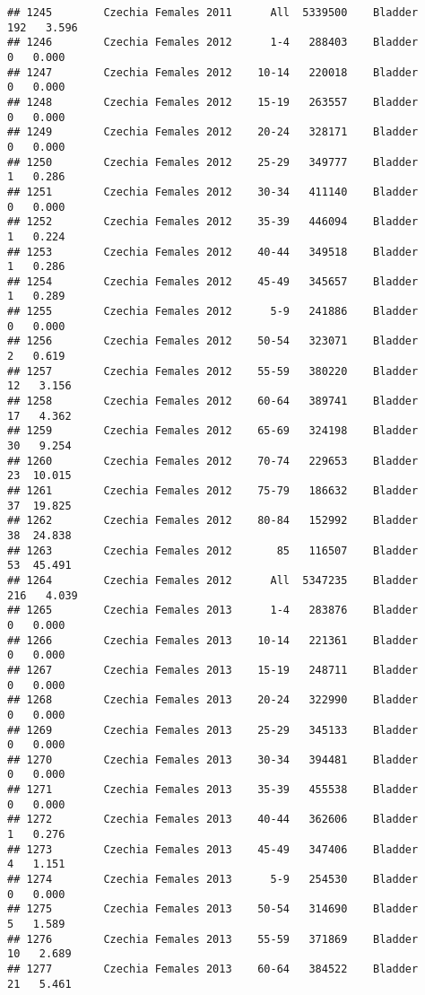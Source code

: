 \documentclass[
]{article}
\begin{document}
\begin{verbatim}
## 1245        Czechia Females 2011      All  5339500    Bladder    192   3.596
## 1246        Czechia Females 2012      1-4   288403    Bladder      0   0.000
## 1247        Czechia Females 2012    10-14   220018    Bladder      0   0.000
## 1248        Czechia Females 2012    15-19   263557    Bladder      0   0.000
## 1249        Czechia Females 2012    20-24   328171    Bladder      0   0.000
## 1250        Czechia Females 2012    25-29   349777    Bladder      1   0.286
## 1251        Czechia Females 2012    30-34   411140    Bladder      0   0.000
## 1252        Czechia Females 2012    35-39   446094    Bladder      1   0.224
## 1253        Czechia Females 2012    40-44   349518    Bladder      1   0.286
## 1254        Czechia Females 2012    45-49   345657    Bladder      1   0.289
## 1255        Czechia Females 2012      5-9   241886    Bladder      0   0.000
## 1256        Czechia Females 2012    50-54   323071    Bladder      2   0.619
## 1257        Czechia Females 2012    55-59   380220    Bladder     12   3.156
## 1258        Czechia Females 2012    60-64   389741    Bladder     17   4.362
## 1259        Czechia Females 2012    65-69   324198    Bladder     30   9.254
## 1260        Czechia Females 2012    70-74   229653    Bladder     23  10.015
## 1261        Czechia Females 2012    75-79   186632    Bladder     37  19.825
## 1262        Czechia Females 2012    80-84   152992    Bladder     38  24.838
## 1263        Czechia Females 2012       85   116507    Bladder     53  45.491
## 1264        Czechia Females 2012      All  5347235    Bladder    216   4.039
## 1265        Czechia Females 2013      1-4   283876    Bladder      0   0.000
## 1266        Czechia Females 2013    10-14   221361    Bladder      0   0.000
## 1267        Czechia Females 2013    15-19   248711    Bladder      0   0.000
## 1268        Czechia Females 2013    20-24   322990    Bladder      0   0.000
## 1269        Czechia Females 2013    25-29   345133    Bladder      0   0.000
## 1270        Czechia Females 2013    30-34   394481    Bladder      0   0.000
## 1271        Czechia Females 2013    35-39   455538    Bladder      0   0.000
## 1272        Czechia Females 2013    40-44   362606    Bladder      1   0.276
## 1273        Czechia Females 2013    45-49   347406    Bladder      4   1.151
## 1274        Czechia Females 2013      5-9   254530    Bladder      0   0.000
## 1275        Czechia Females 2013    50-54   314690    Bladder      5   1.589
## 1276        Czechia Females 2013    55-59   371869    Bladder     10   2.689
## 1277        Czechia Females 2013    60-64   384522    Bladder     21   5.461

\end{verbatim}
\end{document}
